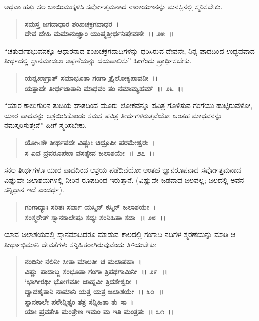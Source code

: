 ಅಥವಾ ಹತ್ತು ಸಲ ಬಾಯಿಮುಕ್ಕಳಿಸಿ ಸರ್ವೋತ್ತಮನಾದ ನಾರಾಯಣನನ್ನು ಮನಸ್ಸಿನಲ್ಲಿ ಸ್ಮರಿಸಬೇಕು.

\begin{verse}
\textbf{ಸಮಸ್ತ ಜಗದಾಧಾರ ಶಂಖಚಕ್ರಗದಾಧರ~।}\\\textbf{ದೇವ ದೇಹಿ ಮಮಾನುಜ್ಞಾಂ ಯುಷ್ಮತ್ತೀರ್ಥನಿಷೇವಣೇ~।। ೨೫~।।}
\end{verse}

``ಚತುರ್ದಶಭುವನಕ್ಕೂ ಆಧಾರನಾದ ಶಂಖಚಕ್ರಗದಾದಿಗಳನ್ನು ಧರಿಸಿರುವ ದೇವನೇ, ನಿನ್ನ ಪಾದದಿಂದ ಉದ್ಭವವಾದ ತೀರ್ಥದಲ್ಲಿ ಸ್ನಾನಮಾಡಲು ಅಪ್ಪಣೆಯನ್ನು ದಯಪಾಲಿಸು” ಹೀಗೆಂದು ಪ್ರಾರ್ಥಿಸಬೇಕು.

\begin{verse}
\textbf{ಯನ್ನಖಾಗ್ರಾತ್ ಸಮಾಭೂತಾ ಗಂಗಾ ತ್ರೈಲೋಕ್ಯಪಾವನೀ~।।}\\\textbf{ಯತ್ಪಾದೇ ತೀರ್ಥಜಾತಾನಿ ಮಾಧವಂ ತಂ ನಮಾಮ್ಯಹಮ್~।। ೨೬~।।}
\end{verse}

“ಯಾರ ಕಾಲುಗುರಿನ ತುದಿಯ ಘಾತದಿಂದ ಮೂರು ಲೋಕವನ್ನೂ ಪವಿತ್ರ ಗೊಳಿಸುವ ಗಂಗೆಯು ಹುಟ್ಟಿರುವಳೋ, ಯಾರ ಪಾದವನ್ನು ಆಶ್ರಯಿಸಿಕೊಂಡು ಸಮಸ್ತ ಪವಿತ್ರ ತೀರ್ಥಗಳಿರುತ್ತವೆಯೋ ಅಂತಹ ಮಾಧವನನ್ನು ನಮಸ್ಕರಿಸುತ್ತೇನೆ” ಹೀಗೆ ಸ್ಮರಿಸಬೇಕು.

\begin{verse}
\textbf{ಯೋsಸೌ ತೀರ್ಥಪದೇ ವಿಷ್ಣುಃ ಚಿದ್ರೂಪೀ ಪರಮೇಶ್ವರಃ~।}\\\textbf{ಸ ಏವ ದ್ರವರೂಪೇಣ ವಸತ್ಯೇವ ಜಲಾಶಯೇ~।। ೨೭~।।}
\end{verse}

ಸಕಲ ತೀರ್ಥಗಳೂ ಯಾರ ಪಾದದಿಂದ ಆಶ್ರಯ ಪಡೆದಿವೆಯೋ ಅಂತಹ ಜ್ಞಾನರೂಪನಾದ ಸರ್ವೋತ್ತಮನಾದ ವಿಷ್ಣುವೇ ಜಲಾಶಯಗಳಲ್ಲಿ ನೀರಿನ ರೂಪದಿಂದ ಇರುತ್ತಾನೆ. (ವಿಷ್ಣುವೇ ಜಡವಾದ ಜಲವಲ್ಲ; ಜಲದಲ್ಲಿ ಅವನ ಸನ್ನಿಧಾನ ಇದೆ ಎಂದರ್ಥ).

\begin{verse}
\textbf{ಗಂಗಾದ್ಯಾಃ ಸರಿತಃ ಸರ್ವಾ ಯಸ್ಮಿನ್ ಕಸ್ಮಿನ್ ಜಲಾಶಯೇ~।}\\\textbf{ಸಂಸ್ಮರೇತ್ ಸ್ನಾನಕಾಲೇಷು ಸದ್ಯಃ ಸಂನಿಹಿತಾ ಸದಾ~।। ೨೮~।।}
\end{verse}

ಯಾವ ಜಲಾಶಯದಲ್ಲಿ ಸ್ನಾನಮಾಡಿದರೂ ಮಾಡುವ ಕಾಲದಲ್ಲಿ ಗಂಗಾದಿ ನದಿಗಳ ಸ್ಮರಣೆಯನ್ನು ಮಾಡಿ ಆ ತೀರ್ಥಾಭಿಮಾನಿ ದೇವತೆಗಳು ಸನ್ನಿಹಿತರಾಗಿರುವುವೆಂದು ತಿಳಿಯಬೇಕು:

\begin{verse}
\textbf{ನಂದಿನೀ ನಲಿನೀ ಸೀತಾ ಮಾಲತೀ ಚ ಮಲಾಪಹಾ~।}\\\textbf{ವಿಷ್ಣು ಪಾದಾಬ್ಜ ಸಂಭೂತಾ ಗಂಗಾ ತ್ರಿಪಥಗಾಮಿನೀ~।। ೨೯~।।}\\\textbf{`ಭಾಗೀರಥೀ ಭೋಗವತೀ ಜಾಹ್ನವೀ ತ್ರಿದಶೇಶ್ವರೀ~।}\\\textbf{ದ್ವಾದಶೈತಾನಿ ನಾಮಾನಿ ಯತ್ರ ಯತ್ರ ಜಲಾಶಯೇ~।। ೩೦~।।}\\\textbf{ಸ್ನಾನಕಾಲೇ ಪಠೇನ್ನಿತ್ಯಂ ತತ್ರ ಸನ್ನಿಹಿತಾ ತು ಸಾ~।}\\\textbf{ಯಾಃ ಪ್ರವತೇತಿ ಮಂತ್ರೇಣ ಇಮಂ ಮ ಇತಿ ಮಂತ್ರತಃ~।। ೩೧~।।}
\end{verse}

